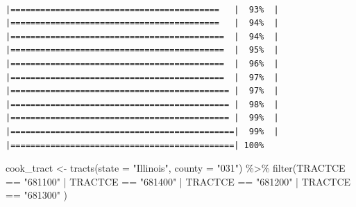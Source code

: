 \documentclass[
  krantz2]{krantz}
\makeatletter
\newenvironment{Shaded}{\begin{snugshade}}{\end{snugshade}}
\newcommand{\AttributeTok}[1]{\textcolor[rgb]{0.61,0.61,0.61}{#1}}
\newcommand{\FunctionTok}[1]{\textcolor[rgb]{0,0,0}{#1}}
\newcommand{\NormalTok}[1]{#1}
\newcommand{\OtherTok}[1]{\textcolor[rgb]{0.37,0.37,0.37}{#1}}
\newcommand{\SpecialCharTok}[1]{\textcolor[rgb]{0,0,0}{#1}}
\newcommand{\StringTok}[1]{\textcolor[rgb]{0.5,0.5,0.5}{#1}}
\newenvironment{kframe}{%
\medskip{}
\setlength{\fboxsep}{.8em}
 \def\at@end@of@kframe{}%
 \ifinner\ifhmode%
  \def\at@end@of@kframe{\end{minipage}}%
  \begin{minipage}{\columnwidth}%
 \fi\fi%
 \def\FrameCommand##1{\hskip\@totalleftmargin \hskip-\fboxsep
 \colorbox{shadecolor}{##1}\hskip-\fboxsep
     \hskip-\linewidth \hskip-\@totalleftmargin \hskip\columnwidth}%
 \MakeFramed {\advance\hsize-\width
   \@totalleftmargin\z@ \linewidth\hsize
   \@setminipage}}%
 {\par\unskip\endMakeFramed%
 \at@end@of@kframe}
\renewenvironment{Shaded}{\begin{kframe}}{\end{kframe}}
\makeatother
\begin{document}
\begin{verbatim}
                             |==========================================   |  93%  |                                                     |==========================================   |  94%  |                                                     |===========================================  |  94%  |                                                     |===========================================  |  95%  |                                                     |===========================================  |  96%  |                                                     |===========================================  |  97%  |                                                     |============================================ |  97%  |                                                     |============================================ |  98%  |                                                     |============================================ |  99%  |                                                     |=============================================|  99%  |                                                     |=============================================| 100%
\end{verbatim}

\begin{Shaded}
\begin{Highlighting}[]
\NormalTok{cook\_tract }\OtherTok{\textless{}{-}} \FunctionTok{tracts}\NormalTok{(}\AttributeTok{state =} \StringTok{"Illinois"}\NormalTok{, }\AttributeTok{county =} \StringTok{"031"}\NormalTok{) }\SpecialCharTok{\%\textgreater{}\%} 
  \FunctionTok{filter}\NormalTok{(TRACTCE }\SpecialCharTok{==} \StringTok{"681100"} \SpecialCharTok{|}\NormalTok{ TRACTCE }\SpecialCharTok{==} \StringTok{"681400"} \SpecialCharTok{|} 
\NormalTok{           TRACTCE }\SpecialCharTok{==} \StringTok{"681200"} \SpecialCharTok{|}\NormalTok{ TRACTCE }\SpecialCharTok{==} \StringTok{"681300"}\NormalTok{ )}
\end{Highlighting}
\end{Shaded}
\end{document}
